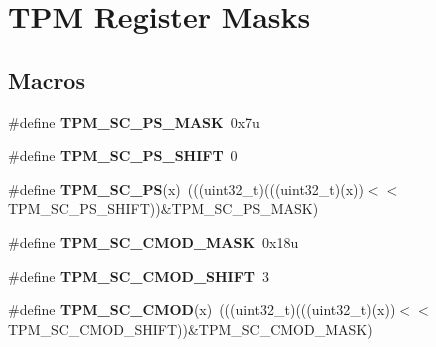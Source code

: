 \hypertarget{group___t_p_m___register___masks}{}\section{T\+PM Register Masks}
\label{group___t_p_m___register___masks}
\subsection*{Macros}
\begin{DoxyCompactItemize}
\item 
\mbox{\label{group___t_p_m___register___masks_gab20218cf8b49b4d2aa932cfafdf5a43e}} 
\#define {\bfseries T\+P\+M\+\_\+\+S\+C\+\_\+\+P\+S\+\_\+\+M\+A\+SK}~0x7u
\item 
\mbox{\label{group___t_p_m___register___masks_ga13fca37c98cc93640be8ed1733cb9805}} 
\#define {\bfseries T\+P\+M\+\_\+\+S\+C\+\_\+\+P\+S\+\_\+\+S\+H\+I\+FT}~0
\item 
\mbox{\label{group___t_p_m___register___masks_ga41fa7e0f125e9bdeaf17b70dea969399}} 
\#define {\bfseries T\+P\+M\+\_\+\+S\+C\+\_\+\+PS}(x)~(((uint32\+\_\+t)(((uint32\+\_\+t)(x))$<$$<$T\+P\+M\+\_\+\+S\+C\+\_\+\+P\+S\+\_\+\+S\+H\+I\+FT))\&T\+P\+M\+\_\+\+S\+C\+\_\+\+P\+S\+\_\+\+M\+A\+SK)
\item 
\mbox{\label{group___t_p_m___register___masks_ga86346adaa1aec83adbcf3a21289d6400}} 
\#define {\bfseries T\+P\+M\+\_\+\+S\+C\+\_\+\+C\+M\+O\+D\+\_\+\+M\+A\+SK}~0x18u
\item 
\mbox{\label{group___t_p_m___register___masks_ga9268286302a41feb004444a7b368af69}} 
\#define {\bfseries T\+P\+M\+\_\+\+S\+C\+\_\+\+C\+M\+O\+D\+\_\+\+S\+H\+I\+FT}~3
\item 
\mbox{\label{group___t_p_m___register___masks_gae0978f8437371339fe391bf34ff321bb}} 
\#define {\bfseries T\+P\+M\+\_\+\+S\+C\+\_\+\+C\+M\+OD}(x)~(((uint32\+\_\+t)(((uint32\+\_\+t)(x))$<$$<$T\+P\+M\+\_\+\+S\+C\+\_\+\+C\+M\+O\+D\+\_\+\+S\+H\+I\+FT))\&T\+P\+M\+\_\+\+S\+C\+\_\+\+C\+M\+O\+D\+\_\+\+M\+A\+SK)
\item 

\end{DoxyCompactItemize}
